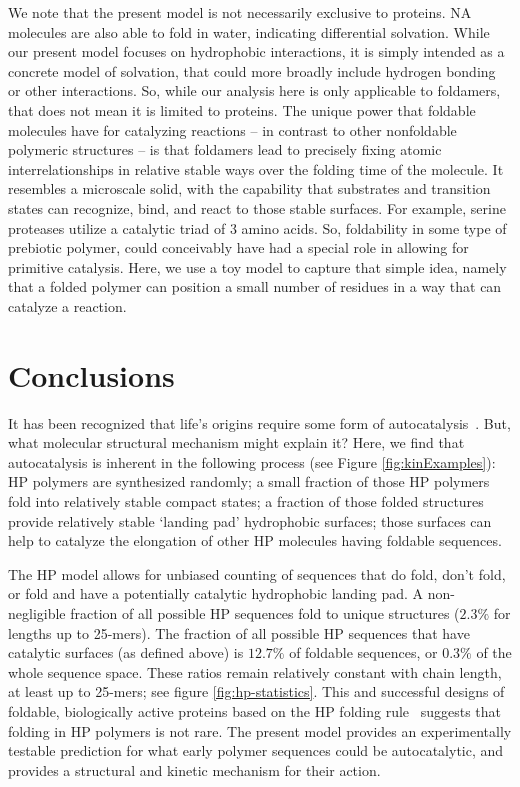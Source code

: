 \documentclass[5p,times]{elsarticle}
\begin{document}
We note that the present model is not necessarily exclusive to proteins.  NA molecules are also 
able 
to fold in water, indicating differential solvation.  While our present model focuses on 
hydrophobic interactions, it is simply intended as a concrete model of solvation, that could more 
broadly include hydrogen bonding or other interactions.  So, while our analysis here is only 
applicable to foldamers, that does not mean it is limited to proteins.  The unique power that 
foldable molecules have for catalyzing reactions -- in contrast to other nonfoldable polymeric 
structures -- is that foldamers lead to precisely fixing atomic interrelationships in relative 
stable ways over the folding time of the molecule.  It resembles a microscale solid, with the 
capability that substrates and transition states can recognize, bind, and react to those stable 
surfaces. For example, serine proteases utilize a catalytic triad of 3 amino acids.  So, 
foldability 
in some type of prebiotic polymer, could conceivably have had a special role in allowing for 
primitive catalysis.  Here, we use a toy model to capture that simple idea, namely that a folded 
polymer can position a small number of residues in a way that can catalyze a reaction.



\section{Conclusions}
\label{sec:evolution}
 It has been recognized that life's origins require some form of 
autocatalysis~\cite{Kauffman1986,Dyson1985,Eigen1978}.  But, what molecular structural mechanism 
might explain it?  Here, we find that autocatalysis is inherent in the following process (see 
Figure \ref{fig:kinExamples}):  HP polymers 
are synthesized randomly; a small fraction of those HP polymers fold into relatively stable 
compact 
states; a fraction of those folded structures provide relatively stable `landing pad' hydrophobic 
surfaces; those surfaces can help to catalyze the elongation of other HP molecules having foldable 
sequences.

 The HP model allows for unbiased counting of sequences that do fold, don't fold, or fold and have 
a potentially catalytic hydrophobic landing pad.  A non-negligible fraction of all possible HP 
sequences fold to unique structures ($2.3\% $ for lengths up to 25-mers). The fraction of all 
possible HP sequences that have catalytic surfaces (as defined above) is $12.7\%$ of foldable 
sequences, or $0.3\%$ of the whole sequence space.  These ratios remain relatively constant with 
chain length, at least up to 25-mers; see figure \ref{fig:hp-statistics}.  This and successful 
designs of foldable, biologically active proteins based on the HP folding rule~\cite{Murphy2015} 
suggests that folding in HP polymers is not rare.  
   The present model provides an experimentally testable prediction for what early 
  polymer sequences could be autocatalytic, and provides a structural and kinetic mechanism for 
their action. 
\end{document}
